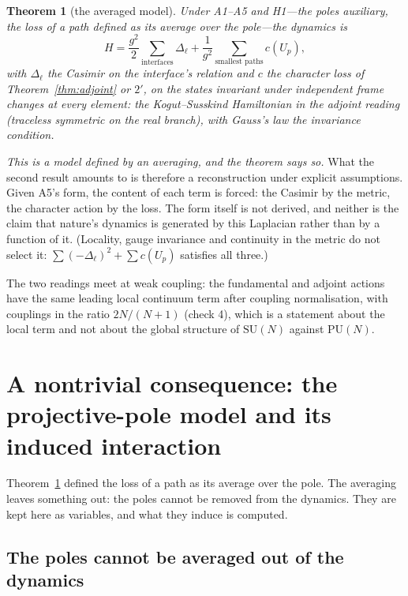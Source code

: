 \documentclass[11pt,a4paper]{article}
\theoremstyle{plain}
\newtheorem{theorem}{Theorem}
\theoremstyle{definition}
\theoremstyle{remark}
\newcommand{\SU}{\mathrm{SU}}
\newcommand{\PU}{\mathrm{PU}}
\begin{document}
\begin{theorem}[the averaged model]\label{thm:averaged}
Under A1--A5 and H1---the poles auxiliary, the loss of a path \emph{defined} as its average over the pole---the dynamics is
\begin{equation}
H=\frac{g^2}{2}\sum_{\text{interfaces}}\Delta_\ell+\frac{1}{g^2}\sum_{\text{smallest paths}}c(U_p),
\end{equation}
with $\Delta_\ell$ the Casimir on the interface's relation and $c$ the character loss of Theorem~\ref{thm:adjoint} or $2'$, on the states invariant under independent frame changes at every element: the Kogut--Susskind Hamiltonian \cite{ks} in the adjoint reading (traceless symmetric on the real branch), with Gauss's law the invariance condition.
\end{theorem}
\emph{This is a model defined by an averaging, and the theorem says so.} What the second result amounts to is therefore a reconstruction under explicit assumptions. Given A5's form, the content of each term is forced: the Casimir by the metric, the character action by the loss. The form itself is not derived, and neither is the claim that nature's dynamics is generated by this Laplacian rather than by a function of it. (Locality, gauge invariance and continuity in the metric do not select it: $\sum(-\Delta_\ell)^2+\sum c(U_p)$ satisfies all three.)

The two readings meet at weak coupling: the fundamental and adjoint actions have the same leading local continuum term after coupling normalisation, with couplings in the ratio $2N/(N+1)$ (check 4), which is a statement about the local term and not about the global structure of $\SU(N)$ against $\PU(N)$.

\clearpage
\section{A nontrivial consequence: the projective-pole model and its induced interaction}\label{sec:consequence}

Theorem~\ref{thm:averaged} defined the loss of a path as its average over the pole. The averaging leaves something out: the poles cannot be removed from the dynamics. They are kept here as variables, and what they induce is computed.

\subsection{The poles cannot be averaged out of the dynamics}
\end{document}
